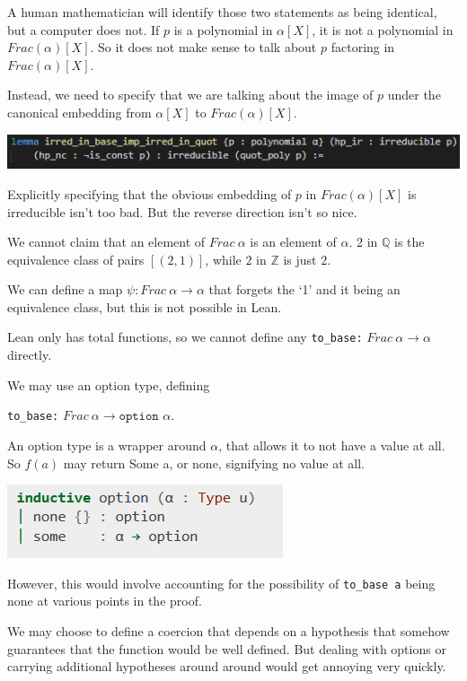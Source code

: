 \documentclass[pagesize=a4]{scrreprt}
\newcommand{\Z}{\mathbb{Z}}
\newcommand{\Q}{\mathbb{Q}}
\begin{document}
A human mathematician will identify those two statements as being identical, but a computer does not. If $p$ is a polynomial in $\alpha[X]$, it is not a polynomial in $Frac(\alpha)[X]$. So it does not make sense to talk about $p$ factoring in $Frac(\alpha)[X]$. 

Instead, we need to specify that we are talking about the image of $p$ under the canonical embedding from $\alpha[X]$ to $Frac(\alpha)[X]$. 


\includegraphics[width=\textwidth]{gauss_fwd.png}
  
  Explicitly specifying that the obvious embedding of $p$ in $Frac (\alpha) [X]$ is irreducible isn't too bad. But the reverse direction isn't so nice. 
  
  We cannot claim that an element of $Frac\ \alpha$ is an element of $\alpha$. 2 in $\Q$ is the equivalence class of pairs $[(2,1)]$, while $2$ in $\Z$ is just $2$. 
 
We can define a map $\psi : Frac\ \alpha \rightarrow \alpha$ that forgets the `1' and it being an equivalence class, but this is not possible in Lean.

    Lean only has total functions, so we cannot define any \texttt{to\_base:} $Frac\ \alpha \rightarrow \alpha$ directly. 
    
    We may use an option type, defining 

    \texttt{to\_base:} $Frac\ \alpha \rightarrow \texttt{option } \alpha$. 

    An option type is a wrapper around $\alpha$, that allows it to not have a value at all.  So $f(a)$ may return Some a, or none, signifying no value at all. 


    \includegraphics[]{option.png}

    However, this would involve accounting for the possibility of \texttt{to\_base a} being none at various points in the proof. 

    We may choose to define a coercion that depends on a hypothesis that somehow guarantees that the function would be well defined.   But dealing with options or carrying additional hypotheses around around would get annoying very quickly.
\end{document}
